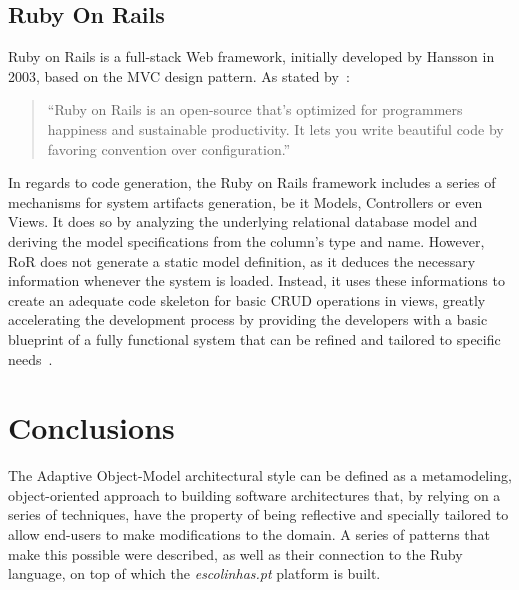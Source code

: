 \subsection{Ruby On Rails}\label{sec:ror}

Ruby on Rails is a full-stack Web framework, initially developed by Hansson in 2003, based on the MVC design pattern. As stated by~\cite{rubyonrails}:

\begin{quote}
  ``Ruby on Rails is an open-source that's optimized for programmers happiness and sustainable productivity. It lets you write beautiful code by favoring convention over configuration.''
\end{quote}

In regards to code generation, the Ruby on Rails framework includes a series of mechanisms for system artifacts generation, be it Models, Controllers or even Views. It does so by analyzing the underlying relational database model and deriving the model specifications from the column's type and name. However, RoR does not generate a static model definition, as it deduces the necessary information whenever the system is loaded. Instead, it uses these informations to create an adequate code skeleton for basic CRUD operations in views, greatly accelerating the development process by providing the developers with a basic blueprint of a fully functional system that can be refined and tailored to specific needs~\cite{rails_generators}.

\section{Conclusions}\label{sec:sota_conclusions}

The Adaptive Object-Model architectural style can be defined as a metamodeling, object-oriented approach to building software architectures that, by relying on a series of techniques, have the property of being reflective and specially tailored to allow end-users to make modifications to the domain. A series of patterns that make this possible were described, as well as their connection to the Ruby language, on top of which the \emph{escolinhas.pt} platform is built.


